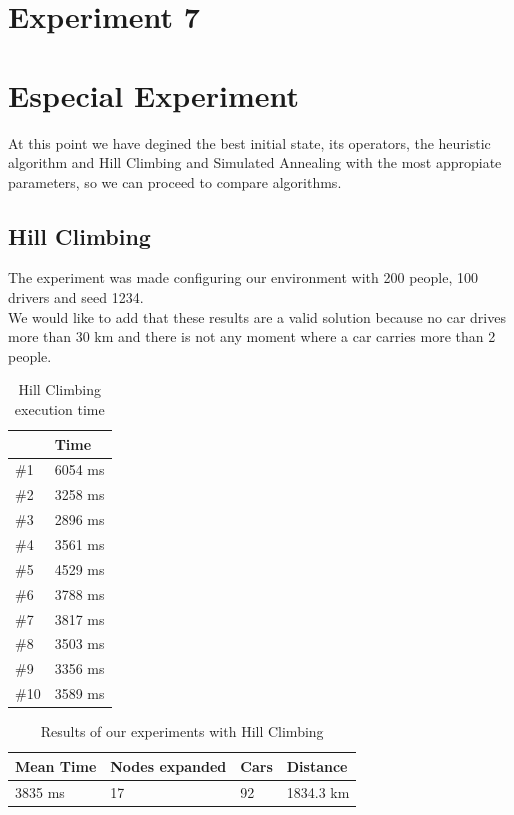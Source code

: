 \documentclass[12]{article}
\begin{document}
\section{Experiment 7}


\section{Especial Experiment}

At this point we have degined the best initial state, its operators, the heuristic algorithm and Hill Climbing and Simulated Annealing with the most appropiate parameters, so we can proceed to compare algorithms. 


\subsection{Hill Climbing}

The experiment was made configuring our environment with 200 people, 100 drivers and seed 1234.
\\

We would like to add that these results are a valid solution because no car drives more than 30 km and there is not any moment where a car carries more than 2 people. 
\\

\begin{table}[h]
\centering
\begin{tabular}{|l|l|}
\hline  & \textbf{Time} \\  \hline
\#1 & 6054 ms \\ \hline
\#2 & 3258 ms \\ \hline
\#3 & 2896 ms \\ \hline
\#4 & 3561 ms \\ \hline
\#5 & 4529 ms \\ \hline
\#6 & 3788 ms \\ \hline
\#7 & 3817 ms \\ \hline
\#8 & 3503 ms \\ \hline
\#9 & 3356 ms \\ \hline
\#10 & 3589 ms \\ \hline
\end{tabular}
\caption{Hill Climbing execution time}
\label{Results}
\end{table}

\begin{table}[h]
\centering
\begin{tabular}{|l|l|l|l|}
\hline \textbf{Mean Time} &
 \textbf{Nodes expanded} & \textbf{Cars} & \textbf{Distance}\\  \hline
3835 ms &  17 & 92 & 1834.3 km \\ \hline
\end{tabular}
\caption{Results of our experiments with Hill Climbing}
\label{Results}
\end{table}
\end{document}
